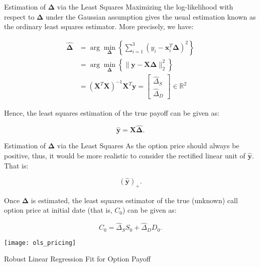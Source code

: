 \documentclass[aspectratio=169,xcolor=dvipsnames]{beamer}
\begin{document}
			\begin{frame}{Estimation of \( \boldsymbol{\Delta} \) via the Least Squares}
				Maximizing the log-likelihood with respect to \( \boldsymbol{\Delta} \) under the Gaussian assumption gives the usual estimation known as the ordinary least squares estimator. More precisely, we have:
				
				\begin{align*}
					\hat{\boldsymbol{\Delta}} 
					&= \arg \min_{\boldsymbol{\Delta}} \left\{ \sum_{i=1}^{3} (y_i - \mathbf{x}_i^T \boldsymbol{\Delta})^2 \right\} \\
					&= \arg \min_{\boldsymbol{\Delta}} \left\{ \| \mathbf{y} - \mathbf{X} \boldsymbol{\Delta} \|_2^2 \right\} \nonumber \\
					&= (\mathbf{X}^T \mathbf{X})^{-1} \mathbf{X}^T \mathbf{y}
					= \begin{bmatrix} \hat{\Delta}_S \\ \hat{\Delta}_D \end{bmatrix} \in \mathbb{R}^2
				\end{align*}
				
				Hence, the least squares estimation of the true payoff can be given as:
				
				\[
				\hat{\mathbf{y}} = \mathbf{X} \hat{\boldsymbol{\Delta}}.
				\]
			\end{frame}
		
					\begin{frame}{Estimation of \( \boldsymbol{\Delta} \) via the Least Squares}
				As the option price should always be positive, thus, it would be more realistic to consider the rectified linear unit of \( \hat{\mathbf{y}} \). That is:
				
				\[
				(\hat{\mathbf{y}})_+.
				\]
				
				Once \( \boldsymbol{\Delta} \) is estimated, the least squares estimator of the true (unknown) call option price at initial date (that is, \( C_0 \)) can be given as:
				
				$$
				\hat{C}_0 = \hat{\Delta}_S S_0 + \hat{\Delta}_D D_0.
				$$
					\end{frame}
	 
	 \begin{frame}
	 	\begin{center}
	 		\texttt{[image: ols\_pricing]}
	 		
	 		Robust Linear Regression Fit for Option Payoff
	 	\end{center}
	\end{frame}
	
\end{document}
